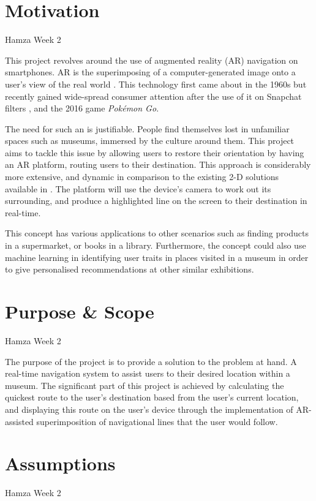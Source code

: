 \section{Motivation}
Hamza Week 2

This project revolves around the use of augmented reality (AR) navigation on smartphones. AR is the superimposing of a computer-generated image onto a user's view of the real world \cite{oxforddict}. This technology first came about in the 1960s \cite{InteractionDesign} but recently gained wide-spread consumer attention after the use of it on Snapchat filters \cite{Snapchat}, and the 2016 game \textit{Pokémon Go}. 

The need for such an  is justifiable. People find themselves lost in unfamiliar spaces such as museums, immersed by the culture around them. This project aims to tackle this issue by allowing users to restore their orientation by having an AR platform, routing users to their destination. This approach is considerably more extensive, and dynamic in comparison to the existing 2-D solutions available in . The platform will use the device's camera to work out its surrounding, and produce a highlighted line on the screen to their destination in real-time.

This concept has various applications to other scenarios such as finding products in a supermarket, or books in a library. Furthermore, the concept could also use machine learning in identifying user traits in places visited in a museum in order to give personalised recommendations at other similar exhibitions.

\section{Purpose \& Scope}
Hamza Week 2

The purpose of the project is to provide a solution to the problem at hand. A real-time navigation system to assist users to their desired location within a museum. The significant part of this project is achieved by calculating the quickest route to the user's destination based from the user's current location, and displaying this route on the user's  device through the implementation of AR-assisted superimposition of navigational lines that the user would follow.

\section{Assumptions}
Hamza Week 2

